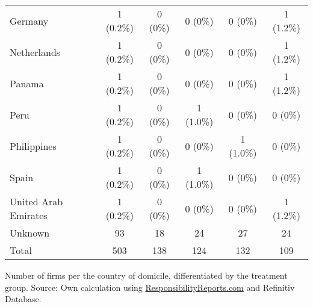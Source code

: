 \documentclass[12pt]{article}
\begin{document}
\begin{table}
\begin{tabular}{lccccc}
        Germany & 1 (0.2\%) & 0 (0\%) & 0 (0\%) & 0 (0\%) & 1 (1.2\%)\\
        Netherlands & 1 (0.2\%) & 0 (0\%) & 0 (0\%) & 0 (0\%) & 1 (1.2\%)\\
        Panama & 1 (0.2\%) & 0 (0\%) & 0 (0\%) & 0 (0\%) & 1 (1.2\%)\\
        Peru & 1 (0.2\%) & 0 (0\%) & 1 (1.0\%) & 0 (0\%) & 0 (0\%)\\
        Philippines & 1 (0.2\%) & 0 (0\%) & 0 (0\%) & 1 (1.0\%) & 0 (0\%)\\
        Spain & 1 (0.2\%) & 0 (0\%) & 1 (1.0\%) & 0 (0\%) & 0 (0\%)\\
        United Arab Emirates & 1 (0.2\%) & 0 (0\%) & 0 (0\%) & 0 (0\%) & 1 (1.2\%)\\
        Unknown & 93 & 18 & 24 & 27 & 24\\
        \midrule
        Total & 503 & 138 &  124 & 132 & 109 \\
        \bottomrule
    \end{tabular}

    \vspace{0.2cm}
    
    \begin{tablenotes}
        \footnotesize
        \item Number of firms per the country of domicile, differentiated by the treatment group. Source: Own calculation using \href{https://responsibilityreports.com}{ResponsibilityReports.com} and Refinitiv Database.
    \end{tablenotes}
    
    

\end{table}

\newpage
\end{document}
